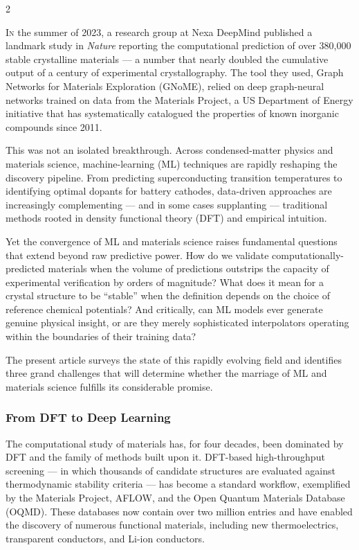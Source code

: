 \documentclass[a4paper,11pt]{article}
\newcommand{\dropcap}[2]{%
  \lettrine[lines=3, lhang=0.25, loversize=0.08, findent=3pt, nindent=0pt]{#1}{#2}%
}
\begin{document}
\begin{multicols}{2}

\dropcap{I}{n} the summer of 2023, a research group at Nexa DeepMind published
a landmark study in \textit{Nature} reporting the computational prediction of
over 380,000 stable crystalline materials --- a number that nearly doubled the
cumulative output of a century of experimental crystallography. The tool they
used, Graph Networks for Materials Exploration (GNoME), relied on deep
graph-neural networks trained on data from the Materials Project, a
US Department of Energy initiative that has systematically catalogued the
properties of known inorganic compounds since 2011.

\medskip
This was not an isolated breakthrough. Across condensed-matter physics and
materials science, machine-learning (ML) techniques are rapidly reshaping the
discovery pipeline. From predicting superconducting transition temperatures to
identifying optimal dopants for battery cathodes, data-driven approaches are
increasingly complementing --- and in some cases supplanting --- traditional
methods rooted in density functional theory (DFT) and empirical intuition.

\medskip
Yet the convergence of ML and materials science raises fundamental questions
that extend beyond raw predictive power. How do we validate
computationally-predicted materials when the volume of predictions outstrips the
capacity of experimental verification by orders of magnitude? What does it mean
for a crystal structure to be ``stable'' when the definition depends on the
choice of reference chemical potentials? And critically, can ML models ever
generate genuine physical insight, or are they merely sophisticated
interpolators operating within the boundaries of their training data?

\medskip
The present article surveys the state of this rapidly evolving field and
identifies three grand challenges that will determine whether the marriage of
ML and materials science fulfills its considerable promise.

\subsubsection{From DFT to Deep Learning}

The computational study of materials has, for four decades, been dominated by
DFT and the family of methods built upon it. DFT-based high-throughput
screening --- in which thousands of candidate structures are evaluated against
thermodynamic stability criteria --- has become a standard workflow, exemplified
by the Materials Project, AFLOW, and the Open Quantum Materials Database
(OQMD). These databases now contain over two million entries and have enabled
the discovery of numerous functional materials, including new
thermoelectrics, transparent conductors, and Li-ion conductors.


\end{multicols}
\end{document}
